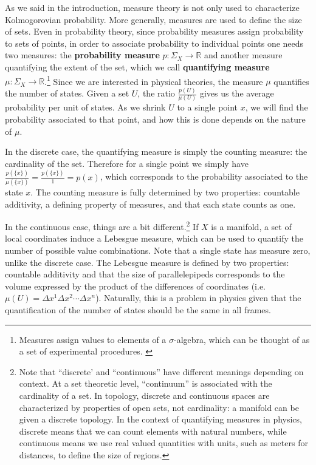 \documentclass[entropy,article,submit,pdftex,moreauthors]{Definitions/mdpi}
\begin{document}
As we said in the introduction, measure theory is not only used to characterize Kolmogorovian probability. More generally, measures are used to define the size of sets. Even in probability theory, since probability measures assign probability to sets of points, in order to associate probability to individual points one needs two measures: the \textbf{probability measure} $p : \Sigma_X \to \mathbb{R}$ and another measure quantifying the extent of the set, which we call \textbf{quantifying measure} $\mu : \Sigma_X \to \mathbb{R}$.\footnote{Measures assign values to elements of a $\sigma$-algebra, which can be thought of as a set of experimental procedures. \cite{aop-book}} Since we are interested in physical theories, the measure $\mu$ quantifies the number of states. Given a set $U$, the ratio $\frac{p(U)}{\mu(U)}$ gives us the average probability per unit of states. As we shrink $U$ to a single point $x$, we will find the probability associated to that point, and how this is done depends on the nature of $\mu$. 

In the discrete case, the quantifying measure is simply the counting measure: the cardinality of the set. Therefore for a single point we simply have $\frac{p(\{x\})}{\mu(\{x\})} = \frac{p(\{x\})}{1} = p(x)$, which corresponds to the probability associated to the state $x$. The counting measure is fully determined by two properties: countable additivity, a defining property of measures, and that each state counts as one.

In the continuous case, things are a bit different.\footnote{Note that ``discrete' and ``continuous'' have different meanings depending on context. At a set theoretic level, ``continuum'' is associated with the cardinality of a set. In topology, discrete and continuous spaces are characterized by  properties of open sets, not cardinality: a manifold can be given a discrete topology. In the context of quantifying measures in physics, discrete means that we can count elements with natural numbers, while continuous means we use real valued quantities with units, such as meters for distances, to define the size of regions.} If $X$ is a manifold, a set of local coordinates induce a Lebesgue measure, which can be used to quantify the number of possible value combinations. Note that a single state has measure zero, unlike the discrete case. The Lebesgue measure is defined by two properties: countable additivity and that the size of parallelepipeds corresponds to the volume expressed by the product of the differences of coordinates (i.e. $\mu(U) = \Delta x^1 \Delta x^2 \cdots \Delta x^n$). Naturally, this is a problem in physics given that the quantification of the number of states should be the same in all frames.
\end{document}
